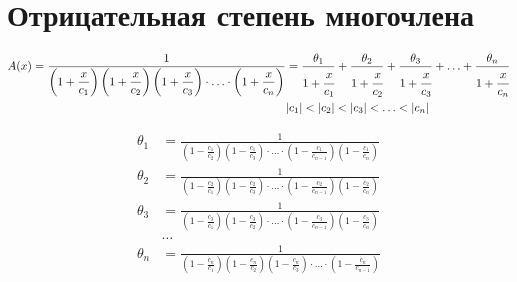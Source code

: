 
\section{Отрицательная степень многочлена}

\begin{equation*} \begin{aligned}
A(x) =
\frac{1}
{
  \left(1 + \displaystyle \frac{x}{c_1} \right)
  \left(1 + \displaystyle \frac{x}{c_2} \right)
  \left(1 + \displaystyle \frac{x}{c_3} \right)
  \cdot \ldots \cdot
  \left(1 + \displaystyle \frac{x}{c_n} \right)
} &
= \frac{\theta_1}{1 + \cfrac{x}{c_1}}
+ \frac{\theta_2}{1 + \cfrac{x}{c_2}}
+ \frac{\theta_3}{1 + \cfrac{x}{c_3}}
+ \ldots
+ \frac{\theta_n}{1 + \cfrac{x}{c_n}} \\
&|c_1| < |c_2| < |c_3| < \ldots < |c_n| \\
\end{aligned} \end{equation*}

\begin{equation*} \begin{aligned}
\theta_1 &= \frac{1}
{
  \left(1 - \displaystyle \frac{c_1}{c_2} \right)
  \left(1 - \displaystyle \frac{c_1}{c_3} \right)
  \cdot \ldots \cdot
  \left(1 - \displaystyle \frac{c_1}{c_{n - 1}} \right)
  \left(1 - \displaystyle \frac{c_1}{c_n} \right)
} \\
\theta_2 &= \frac{1}
{
  \left(1 - \displaystyle \frac{c_2}{c_1} \right)
  \left(1 - \displaystyle \frac{c_2}{c_3} \right)
  \cdot \ldots \cdot
  \left(1 - \displaystyle \frac{c_2}{c_{n - 1}} \right)
  \left(1 - \displaystyle \frac{c_2}{c_n} \right)
} \\
\theta_3 &= \frac{1}
{
  \left(1 - \displaystyle \frac{c_3}{c_1} \right)
  \left(1 - \displaystyle \frac{c_3}{c_2} \right)
  \cdot \ldots \cdot
  \left(1 - \displaystyle \frac{c_3}{c_{n - 1}} \right)
  \left(1 - \displaystyle \frac{c_3}{c_n} \right)
} \\
&\ldots \\
\theta_n &= \frac{1}
{
  \left(1 - \displaystyle \frac{c_n}{c_1} \right)
  \left(1 - \displaystyle \frac{c_n}{c_2} \right)
  \left(1 - \displaystyle \frac{c_n}{c_3} \right)
  \cdot \ldots \cdot
  \left(1 - \displaystyle \frac{c_n}{c_{n - 1}} \right)
} \\
\end{aligned} \end{equation*}


